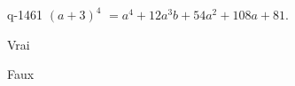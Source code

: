 \begin{truefalse}{q-1461}
$(a+3)^4$ $=a^4+12a^3b+54a^2+108a+81$.
\item* Vrai
\item Faux
\end{truefalse}

